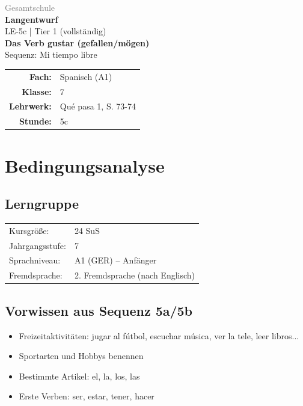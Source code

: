 \documentclass[11pt,a4paper]{article}
\newcommand{\fach}{Spanisch}
\newcommand{\jahrgangsstufe}{7}
\newcommand{\schulart}{Gesamtschule}
\newcommand{\stundenthema}{Das Verb gustar (gefallen/mögen)}
\newcommand{\reihenthema}{Mi tiempo libre}
\newcommand{\stundennummer}{5c}
\newcommand{\gerniveau}{A1}
\newcommand{\lehrwerk}{Qué pasa 1}
\newcommand{\lehrwerkseite}{S. 73-74}
\newcommand{\lerngruppengroesse}{24}
\begin{document}
\begin{titlepage}
    \centering
    \vspace*{2cm}
    {\large\textcolor{gray}{\schulart}}\\[2cm]
    {\Huge\textcolor{fach}{\textbf{Langentwurf}}}\\[0.5cm]
    {\large LE-\stundennummer{} | Tier 1 (vollständig)}\\[2cm]
    {\LARGE\textbf{\stundenthema}}\\[0.5cm]
    {\large Sequenz: \reihenthema}\\[2cm]
    \begin{tabular}{rl}
        \textbf{Fach:} & \fach{} (\gerniveau) \\[0.3cm]
        \textbf{Klasse:} & \jahrgangsstufe \\[0.3cm]
        \textbf{Lehrwerk:} & \lehrwerk, \lehrwerkseite \\[0.3cm]
        \textbf{Stunde:} & \stundennummer{} \\[0.3cm]
    \end{tabular}
    \vfill
\end{titlepage}

\tableofcontents
\newpage

\section{Bedingungsanalyse}

\subsection{Lerngruppe}
\begin{tabular}{ll}
    Kursgröße: & \lerngruppengroesse{} SuS \\
    Jahrgangsstufe: & \jahrgangsstufe \\
    Sprachniveau: & \gerniveau{} (GER) -- Anfänger \\
    Fremdsprache: & 2. Fremdsprache (nach Englisch) \\
\end{tabular}

\subsection{Vorwissen aus Sequenz 5a/5b}
\begin{itemize}
    \item Freizeitaktivitäten: jugar al fútbol, escuchar música, ver la tele, leer libros...
    \item Sportarten und Hobbys benennen
    \item Bestimmte Artikel: el, la, los, las
    \item Erste Verben: ser, estar, tener, hacer
\end{itemize}
\end{document}
